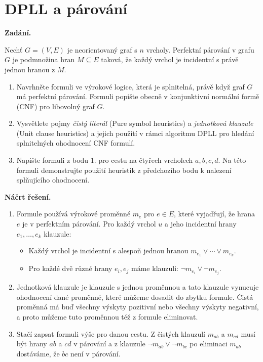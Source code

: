 \section{DPLL a párování}

\noindent\textbf{Zadání.}\par
Nechť $G = (V, E)$ je neorientovaný graf s $n$ vrcholy. Perfektní párování v grafu $G$ je podmnožina hran $M \subseteq E$ taková, že každý vrchol je incidentní s právě jednou hranou z $M$.
\begin{enumerate}[nosep]
  \item Navrhněte formuli ve výrokové logice, která je splnitelná, právě když graf $G$ má perfektní párování. Formuli popište obecně v konjunktivní normální formě (CNF) pro libovolný graf $G$.
  \item Vysvětlete pojmy \textit{čistý literál} (Pure symbol heuristics) a \textit{jednotková klauzule} (Unit clause heuristics) a jejich použití v rámci algoritmu DPLL pro hledání splnitelných ohodnocení CNF formulí.
  \item Napište formuli z bodu 1. pro cestu na čtyřech vrcholech $a, b, c, d$. Na této formuli demonstrujte použití heuristik z předchozího bodu k nalezení splňujícího ohodnocení.
\end{enumerate}

\medskip
\noindent\textbf{Náčrt řešení.}\par
\begin{enumerate}[nosep]
  \item Formule používá výrokové proměnné $m_e$ pro $e \in E$, které vyjadřují, že hrana $e$ je v perfektním párování. Pro každý vrchol $u$ a jeho incidentní hrany $e_1, \dots, e_k$ klauzule:
  \begin{itemize}[nosep]
    \item Každý vrchol je incidentní s alespoň jednou hranou $m_{e_1} \vee \cdots \vee m_{e_k}$.
    \item Pro každé dvě různé hrany $e_i, e_j$ máme klauzuli: $\neg m_{e_i} \vee \neg m_{e_j}$.
  \end{itemize}
  \item Jednotková klauzule je klauzule s jednou proměnnou a tato klauzule vynucuje ohodnocení dané proměnné, které můžeme dosadit do zbytku formule. Čistá proměnná má buď všechny výskyty pozitivní nebo všechny výskyty negativní, a proto můžeme tuto proměnnou též z formule eliminovat.
  \item Stačí zapsat formuli výše pro danou cestu. Z čistých klauzulí $m_{ab}$ a $m_{cd}$ musí být hrany $ab$ a $cd$ v párování a z klauzule $\neg m_{ab} \vee \neg m_{bc}$ po eliminaci $m_{ab}$ dostáváme, že $bc$ není v párování.
\end{enumerate}

